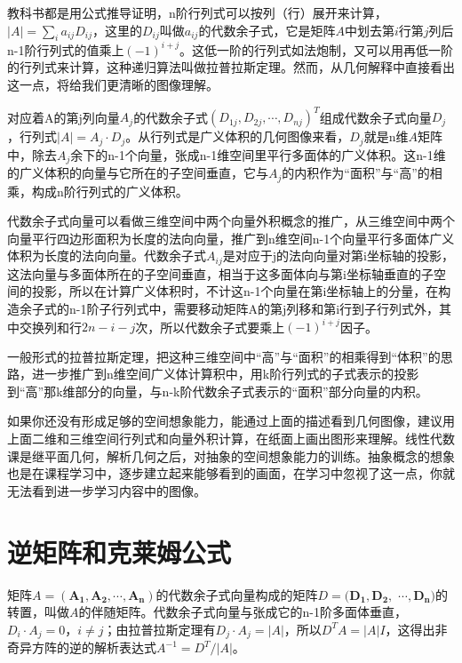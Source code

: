 	教科书都是用公式推导证明，n阶行列式可以按列（行）展开来计算，$ |A| = \sum_{i}a_{ij}D_{ij} $，这里的$ D_{ij} $叫做$ a_{ij} $的代数余子式，它是矩阵$ A $中划去第$ i $行第$ j $列后n-1阶行列式的值乘上$ (-1)^{i+j} $。这低一阶的行列式如法炮制，又可以用再低一阶的行列式来计算，这种递归算法叫做拉普拉斯定理。然而，从几何解释中直接看出这一点，将给我们更清晰的图像理解。
	
	对应着A的第j列向量$ A_j $的代数余子式$  (D_{1j},D_{2j}, \cdots, D_{nj})^T $组成代数余子式向量$ D_j $，行列式$ |A|=A_j\cdot D_j $。从行列式是广义体积的几何图像来看，$ D_j $就是n维$ A $矩阵中，除去$ A_j $余下的n-1个向量，张成n-1维空间里平行多面体的广义体积。这n-1维的广义体积的向量与它所在的子空间垂直，它与$ A_j $的内积作为``面积''与``高''的相乘，构成n阶行列式的广义体积。
	
	代数余子式向量可以看做三维空间中两个向量外积概念的推广，从三维空间中两个向量平行四边形面积为长度的法向向量，推广到n维空间n-1个向量平行多面体广义体积为长度的法向向量。代数余子式$ A_{ij} $是对应于j的法向向量对第i坐标轴的投影，这法向量与多面体所在的子空间垂直，相当于这多面体向与第i坐标轴垂直的子空间的投影，所以在计算广义体积时，不计这n-1个向量在第i坐标轴上的分量，在构造余子式的n-1阶子行列式中，需要移动矩阵A的第j列移和第i行到子行列式外，其中交换列和行$ 2n-i-j $次，所以代数余子式要乘上$ (-1)^{i+j} $因子。
	
	一般形式的拉普拉斯定理，把这种三维空间中``高''与``面积''的相乘得到``体积''的思路，进一步推广到n维空间广义体计算积中，用k阶行列式的子式表示的投影到``高''那k维部分的向量，与n-k阶代数余子式表示的``面积''部分向量的内积。
	
	如果你还没有形成足够的空间想象能力，能通过上面的描述看到几何图像，建议用上面二维和三维空间行列式和向量外积计算，在纸面上画出图形来理解。线性代数课是继平面几何，解析几何之后，对抽象的空间想象能力的训练。抽象概念的想象也是在课程学习中，逐步建立起来能够看到的画面，在学习中忽视了这一点，你就无法看到进一步学习内容中的图像。
	
	\section{逆矩阵和克莱姆公式}
	
	矩阵$ A = (\mathbf{A_1},\mathbf{ A_2}, \cdots,\mathbf{A_n}) $的代数余子式向量构成的矩阵$ D = (\mathbf{D_1}, \mathbf{D_2},$  $\cdots,\mathbf{D_n}) $的转置，叫做$ A $的伴随矩阵。代数余子式向量与张成它的n-1阶多面体垂直，$ D_i·A_j = 0，i \neq j $；由拉普拉斯定理有$ D_j\cdot A_j = |A| $，所以$ D^TA = |A|I $，这得出非奇异方阵的逆的解析表达式$  A^{-1} = D^T/|A| $。
	
